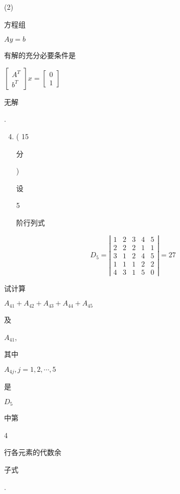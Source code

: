 \documentclass[10pt]{article}
\begin{document}
(2) \begin{CJK}{UTF8}{mj}方程组\end{CJK} $A y=b$ \begin{CJK}{UTF8}{mj}有解的充分必要条件是\end{CJK} $\left[\begin{array}{c}A^{T} \\ b^{T}\end{array}\right] x=\left[\begin{array}{l}0 \\ 1\end{array}\right]$ \begin{CJK}{UTF8}{mj}无解\end{CJK}.

\begin{enumerate}
  \setcounter{enumi}{3}
  \item ( 15 \begin{CJK}{UTF8}{mj}分\end{CJK}) \begin{CJK}{UTF8}{mj}设\end{CJK} 5 \begin{CJK}{UTF8}{mj}阶行列式\end{CJK}
\end{enumerate}
$$
D_{5}=\left|\begin{array}{lllll}
1 & 2 & 3 & 4 & 5 \\
2 & 2 & 2 & 1 & 1 \\
3 & 1 & 2 & 4 & 5 \\
1 & 1 & 1 & 2 & 2 \\
4 & 3 & 1 & 5 & 0
\end{array}\right|=27
$$
\begin{CJK}{UTF8}{mj}试计算\end{CJK} $A_{41}+A_{42}+A_{43}+A_{44}+A_{45}$ \begin{CJK}{UTF8}{mj}及\end{CJK} $A_{41}$, \begin{CJK}{UTF8}{mj}其中\end{CJK} $A_{4 j}, j=1,2, \cdots, 5$ \begin{CJK}{UTF8}{mj}是\end{CJK} $D_{5}$ \begin{CJK}{UTF8}{mj}中第\end{CJK} 4 \begin{CJK}{UTF8}{mj}行各元素的代数余\end{CJK} \begin{CJK}{UTF8}{mj}子式\end{CJK}.
\end{document}
